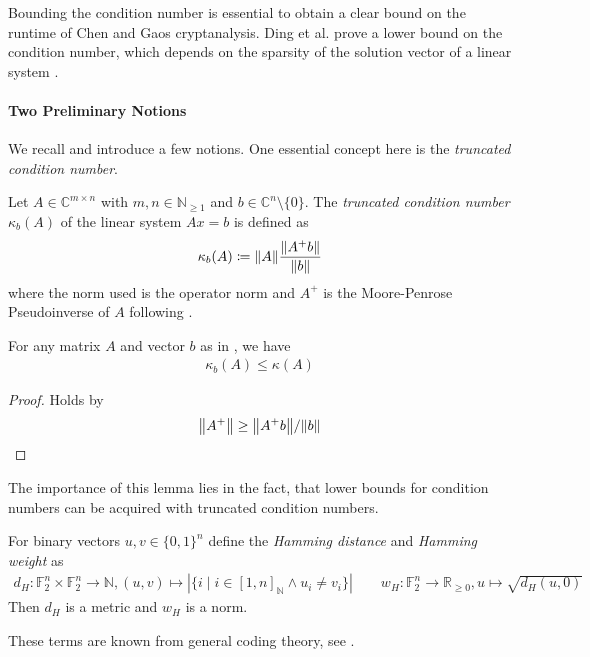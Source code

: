 Bounding the condition number is essential to obtain a clear bound on the runtime of Chen and Gaos cryptanalysis. Ding et al. prove a lower bound on the condition number, which depends on the sparsity of the solution vector of a linear system \cite{Ding2021}.

\paragraph*{Two Preliminary Notions} We recall and introduce a few notions. One essential concept here is the \emph{truncated condition number}.
\begin{definition} \label{truncated_condition_number_definition}
    Let \(A \in \mathbb{C}^{m \times n}\) with \(m, n \in \mathbb{N}_{\geq 1}\) and \(b \in \mathbb{C}^n \setminus \{0\}\). The \emph{truncated condition number} \(\kappa_b(A)\) of the linear system \(Ax = b\) is defined as
    \begin{align}
        \kappa_b(A) \coloneqq \norm{A}\frac{\norm{A^+b}}{\norm{b}}
    \end{align}
    where the norm used is the operator norm and \(A^+\) is the Moore-Penrose Pseudoinverse of \(A\) following .
\end{definition}

\begin{lemma}
    For any matrix \(A\) and vector \(b\) as in , we have
    \begin{align}
        \kappa_b(A) \leq \kappa(A)
    \end{align}
\end{lemma}
\begin{proof}
    Holds by
    \begin{align}
        \norm{A^+} \geq \norm{A^+b}/\norm{b}
    \end{align}
\end{proof}
The importance of this lemma lies in the fact, that lower bounds for condition numbers can be acquired with truncated condition numbers.

\begin{theorem}
    For binary vectors \(u, v \in \{0, 1\}^n\) define the \emph{Hamming distance} and \emph{Hamming weight} as
    \begin{align}
        d_H\colon \mathbb{F}_2^n \times \mathbb{F}_2^n \to \mathbb{N}, (u, v) \mapsto |\{i \mid i \in [1, n]_{\mathbb{N}} \land u_i \neq v_i\}| \qquad w_H\colon \mathbb{F}_2^n \to \mathbb{R}_{\geq 0}, u \mapsto \sqrt{d_H(u, 0)}
    \end{align}
    Then \(d_H\) is a metric and \(w_H\) is a norm.
\end{theorem}
These terms are known from general coding theory, see \cite[pp. 100-101]{Schulz2003}.

